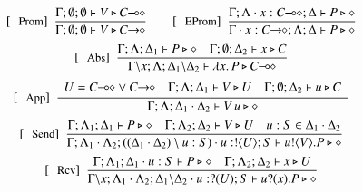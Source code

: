 

\begin{figure}[t]
\[
	\begin{array}{c}
%
		\trule{Prom}~~\tree{
			\Gamma; \emptyset; \emptyset \proves V \hastype 
                         \lhot{C}
		}{
			\Gamma; \emptyset; \emptyset \proves V \hastype 
                         \shot{C}
		} 
		\qquad
		\trule{EProm}~~\tree{
		\Gamma; \Lambda \cat x : \lhot{C}; \Delta \proves P \hastype \Proc
		}{
			\Gamma \cat x:\shot{C}; \Lambda; \Delta \proves P \hastype \Proc
		}
		\\[4mm]

		\trule{Abs}~~\tree{
			\Gamma; \Lambda; \Delta_1 \proves P \hastype \Proc
			\quad
			\Gamma; \es; \Delta_2 \proves x \hastype C
		}{
			\Gamma\backslash x; \Lambda; \Delta_1 \backslash \Delta_2 \proves \abs{{x}}{P} \hastype \lhot{{C}}
		}
		\\[4mm]

		\trule{App}~~\tree{
			\begin{array}{c}
				U = \lhot{C} \lor \shot{C}
				\quad
				\Gamma; \Lambda; \Delta_1 \proves V \hastype U
				\quad
				\Gamma; \es; \Delta_2 \proves u \hastype C
			\end{array}
		}{
			\Gamma; \Lambda; \Delta_1 \cat \Delta_2 \proves \appl{V}{u} \hastype \Proc
		} 
		\\[4mm]

		\trule{Send}~~\tree{
			\Gamma; \Lambda_1; \Delta_1 \proves P \hastype \Proc
			\quad
			\Gamma; \Lambda_2; \Delta_2 \proves V \hastype U
			\quad
			u:S \in \Delta_1 \cat \Delta_2
		}{
			\Gamma; \Lambda_1 \cat \Lambda_2; ((\Delta_1 \cat \Delta_2) \setminus u:S) \cat u:\btout{U} S \proves \bout{u}{V} P \hastype \Proc
		}
		\\[4mm]

		\trule{Rcv}~~\tree{
			\Gamma; \Lambda_1; \Delta_1 \cat u: S \proves P \hastype \Proc
			\quad
			\Gamma; \Lambda_2; \Delta_2 \proves {x} \hastype {U}
		}{
			\Gamma \backslash x; \Lambda_1\cat \Lambda_2; \Delta_1\backslash \Delta_2 \cat u: \btinp{U} S \vdash \binp{u}{{x}} P \hastype \Proc
		}
		\\[4mm]


\end{array}\]
\end{figure}

